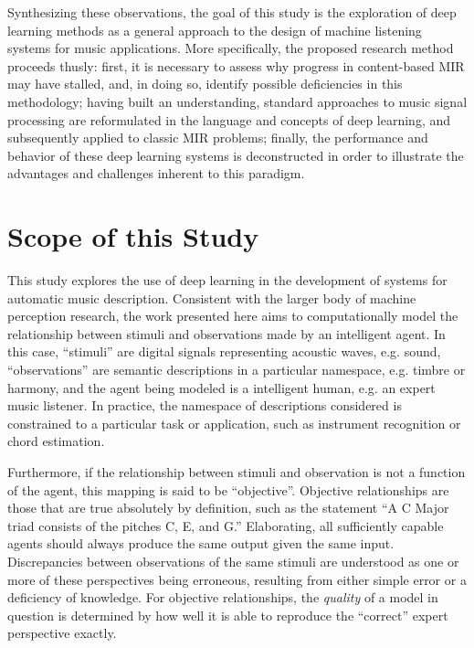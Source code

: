 Synthesizing these observations, the goal of this study is the exploration of deep learning methods as a general approach to the design of machine listening systems for music applications.
More specifically, the proposed research method proceeds thusly:
first, it is necessary to assess why progress in content-based MIR may have stalled, and, in doing so, identify possible deficiencies in this methodology;
having built an understanding, standard approaches to music signal processing are reformulated in the language and concepts of deep learning, and subsequently applied to classic MIR problems;
finally, the performance and behavior of these deep learning systems is deconstructed in order to illustrate the advantages and challenges inherent to this paradigm.


\section{Scope of this Study}
\label{sec:scope}


This study explores the use of deep learning in the development of systems for automatic music description.
Consistent with the larger body of machine perception research, the work presented here aims to computationally model the relationship between stimuli and observations made by an intelligent agent.
In this case, ``stimuli'' are digital signals representing acoustic waves, e.g. sound, ``observations'' are semantic descriptions in a particular namespace, e.g. timbre or harmony, and the agent being modeled is a intelligent human, e.g. an expert music listener.
In practice, the namespace of descriptions considered is constrained to a particular task or application, such as instrument recognition or chord estimation.

Furthermore, if the relationship between stimuli and observation is not a function of the agent, this mapping is said to be ``objective''.
Objective relationships are those that are true absolutely by definition, such as the statement ``A C Major triad consists of the pitches C, E, and G.''
Elaborating, all sufficiently capable agents should always produce the same output given the same input.
Discrepancies between observations of the same stimuli are understood as one or more of these perspectives being erroneous, resulting from either simple error or a deficiency of knowledge.
For objective relationships, the \emph{quality} of a model in question is determined by how well it is able to reproduce the ``correct'' expert perspective exactly.

